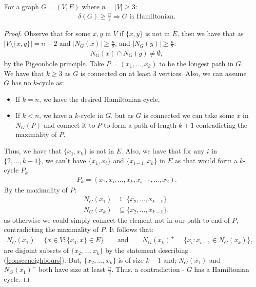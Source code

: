For a graph $G = (V, E)$ where $n = |V| \geq 3$: \begin{gather*}
  \delta(G) \geq \frac{n}{2} \Rightarrow G \text{ is Hamiltonian.}
\end{gather*}
\begin{proof}
    Observe that for some $x, y$ in $V$ if $\{x, y\}$ is not in $E$,
    then we have that as $|V \setminus \{x, y\}| = n - 2$ and
    $|N_G(x)| \geq \frac{n}{2}$, and $|N_G(y)| \geq \frac{n}{2}$: 
    \begin{gather*}
        N_G(x) \cap N_G(y) \neq \emptyset,
    \end{gather*} by the Pigeonhole principle. Take $P = (x_1, \ldots, x_k)$
    to be the longest path in $G$. We have that $k \geq 3$ as $G$ is
    connected on at least 3 vertices. Also, we can assume $G$ has no
    $k$-cycle as: \begin{itemize}
        \item If $k = n$, we have the desired Hamiltonian cycle,
        \item If $k < n$, we have a $k$-cycle in $G$, but as $G$ is connected
        we can take some $x$ in $N_G(P)$ and connect it to $P$ to form
        a path of length $k + 1$ contradicting the maximality of $P$. 
    \end{itemize} Thus, we have that $\{x_1, x_k\}$ is not in $E$.
    Also, we have that for any $i$ in $\{2, \ldots, k - 1\}$, we can't
    have $\{x_1, x_i\}$ and $\{x_{i - 1}, x_k\}$ in $E$ as that would form
    a $k$-cycle $P_k$: \begin{gather} \label{consecneighbours}
        P_k = (x_1, x_i, \ldots, x_k, x_{i - 1}, \ldots, x_2).
    \end{gather} By the maximality of $P$: 
    \begin{equation*}   
        \begin{aligned}
            N_G(x_1) &\subseteq \{x_2, \ldots, x_{k - 1}\} \\
            N_G(x_k) &\subseteq \{x_2, \ldots, x_{k - 1}\},
        \end{aligned}
    \end{equation*}
    as otherwise we could simply connect the element not in our
    path to end of $P$, contradicting the maximality of $P$.
    It follows that: \begin{gather*}
        N_G(x_1) = \{x \in V : \{x_1, x\} \in E\} \qquad
        \text{and} \qquad
        N_G(x_k)^+ = \{x_i : x_{i - 1} \in N_G(x_k)\},
    \end{gather*} are disjoint subsets of $\{x_2, \ldots, x_k\}$
    by the statement describing (\ref{consecneighbours}).
    But, $\{x_2, \ldots, x_k\}$ is of size $k - 1$ and; 
    $N_G(x_1)$ and $N_G(x_1)^+$ both have size at least $\frac{n}{2}$.
    Thus, a contradiction - $G$ has a Hamiltonian cycle.
\end{proof}